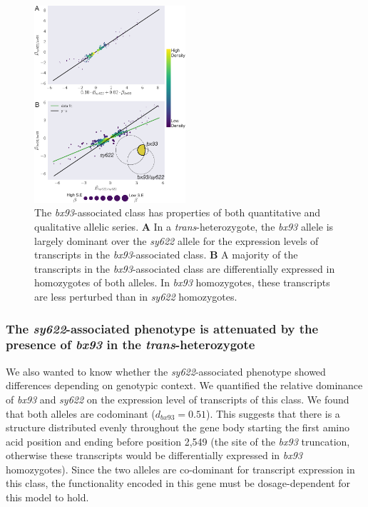 \documentclass[10pt, twocolumn]{article}
\begin{document}
\begin{figure}
  \centering{}
  \includegraphics[width=0.5\textwidth]{../figs/bx93_associated_analysis.pdf}
  \caption{The \emph{bx93}-associated class has properties of both quantitative
    and qualitative allelic series.
    \textbf{A} In a \emph{trans}-heterozygote, the \emph{bx93} allele is largely
    dominant over the \emph{sy622} allele for the expression levels of
    transcripts in the \emph{bx93}-associated class.
    \textbf{B} A majority of the transcripts in the \emph{bx93}-associated class
    are differentially expressed in homozygotes of both alleles. In \emph{bx93}
    homozygotes, these transcripts are less perturbed than in \emph{sy622}
    homozygotes.
    }
\label{fig:bx93_associated}
\end{figure}

\subsubsection*{The \emph{sy622}-associated phenotype is attenuated by the
                presence of \emph{bx93} in the \emph{trans}-heterozygote}
We also wanted to know whether the \emph{sy622}-associated phenotype showed
differences depending on genotypic context. We quantified the relative dominance
of \emph{bx93} and \emph{sy622} on the expression level of transcripts of this
class. We found that both alleles are codominant ($d_{bx93} = 0.51$). This
suggests that there is a structure distributed evenly throughout the gene
body starting the first amino acid position and ending before position 2,549
(the site of the \emph{bx93} truncation, otherwise these transcripts would be
differentially expressed in \emph{bx93} homozygotes). Since the two alleles are
co-dominant for transcript expression in this class, the functionality encoded
in this gene must be dosage-dependent for this model to hold.
\end{document}
